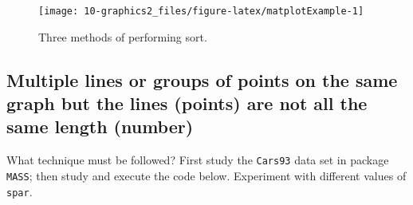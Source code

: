 \documentclass[
]{book}
\begin{document}
\begin{figure}
\texttt{[image: 10-graphics2\_files/figure-latex/matplotExample-1]} \caption{Three methods of performing sort.}\label{fig:matplotExample}
\end{figure}

\subsection{Multiple lines or groups of points on the same graph but the lines (points) are not all the same length (number)}\label{multipleLines}

What technique must be followed? First study the \texttt{Cars93} data set in package \texttt{MASS}; then study and execute the code below. Experiment with different values of \texttt{spar}.
\end{document}
